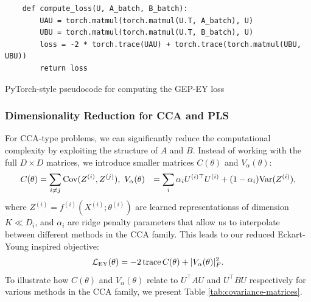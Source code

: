 \begin{listing}[ht]
    \begin{verbatim}
    def compute_loss(U, A_batch, B_batch):
        UAU = torch.matmul(torch.matmul(U.T, A_batch), U)
        UBU = torch.matmul(torch.matmul(U.T, B_batch), U)
        loss = -2 * torch.trace(UAU) + torch.trace(torch.matmul(UBU, UBU))
        return loss
    \end{verbatim}
    \caption{PyTorch-style pseudocode for computing the GEP-EY loss}
    \label{lst:gep-ey-loss}
\end{listing}

\subsubsection{Dimensionality Reduction for CCA and PLS}
For CCA-type problems, we can significantly reduce the computational complexity by exploiting the structure of $A$ and $B$. Instead of working with the full $D \times D$ matrices, we introduce smaller matrices $C(\theta)$ and $V_\alpha(\theta)$:
\begin{align}\label{eq:def-C-V-matrices}
C(\theta) &= \sum_{i \neq j} \mathrm{Cov}(Z^{(i)}, Z^{(j)}), \
V_\alpha(\theta) &= \sum_i \alpha_i U^{(i)\top} U^{(i)} + (1 - \alpha_i) \mathrm{Var}(Z^{(i)}),
\end{align}
where $Z^{(i)} = f^{(i)}(X^{(i)}; \theta^{(i)})$ are learned \glspl{representations} of dimension $K \ll D_i$, and $\alpha_i$ are ridge penalty parameters that allow us to interpolate between different methods in the CCA family.
This leads to our reduced Eckart-Young inspired objective:
\begin{align}\label{eq:EY-loss-def-C-V}
\mathcal{L}_\text{EY}(\theta) = -2 \operatorname{trace} C(\theta) + |V_\alpha(\theta)|_F^2.
\end{align}
To illustrate how $C(\theta)$ and $V_\alpha(\theta)$ relate to $U^\top A U$ and $U^\top B U$ respectively for various methods in the CCA family, we present Table \ref{tab:covariance-matrices}.
